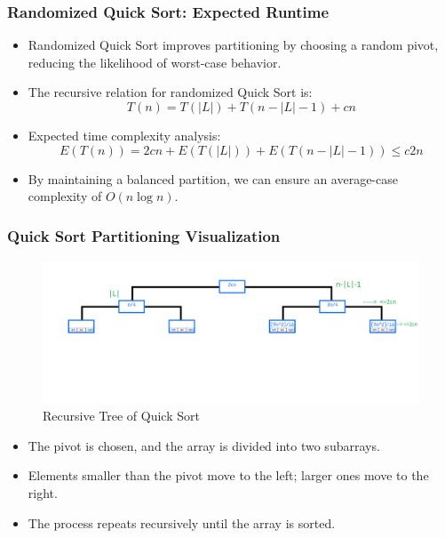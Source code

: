 \begin{frame}
    \frametitle{Randomized Quick Sort: Expected Runtime}
    \begin{itemize}
        \item Randomized Quick Sort improves partitioning by choosing a random pivot, reducing the likelihood of worst-case behavior.
        \item The recursive relation for randomized Quick Sort is:
        \[
        T(n) = T(|L|) + T(n - |L| - 1) + cn
        \]
        \item Expected time complexity analysis:
        \[
        E(T(n)) = 2cn + E(T(|L|)) + E(T(n - |L| - 1)) \leq c2n
        \]
        \item By maintaining a balanced partition, we can ensure an average-case complexity of \( O(n \log n) \).
    \end{itemize}
\end{frame}

\begin{frame}
    \frametitle{Quick Sort Partitioning Visualization}
    
    \begin{figure}
        \centering
        \includegraphics[width=0.7\linewidth]{figures/general/tree.png}
        \caption{Recursive Tree of Quick Sort }
    \end{figure}
    
    \begin{itemize}
        \item The pivot is chosen, and the array is divided into two subarrays.
        \item Elements smaller than the pivot move to the left; larger ones move to the right.
        \item The process repeats recursively until the array is sorted.
    \end{itemize}
\end{frame}



